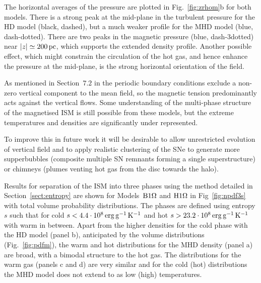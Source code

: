 \documentclass[useAMS,usenatbib]{mn2e}
\begin{document}
The horizontal averages of the pressure are plotted in Fig.~\ref{fig:zrhom}b for both models. There is a strong peak at the mid-plane in the turbulent pressure for the HD model (black, dashed), but a much weaker profile for the MHD model (blue, dash-dotted). There are two peaks in the magnetic pressure (blue, dash-3dotted) near $|z|\simeq200\,{\rm pc}$, which supports the extended density profile. Another possible effect, which might constrain the circulation of the hot gas, and hence enhance the pressure at the mid-plane, is the strong horizontal orientation of the field.

As mentioned in Section~$7.2$ in \citet{Gent12} the periodic boundary conditions exclude a non-zero vertical component to the mean field, so the magnetic tension predominantly acts against the vertical flows. Some understanding of the multi-phase structure of the magnetised ISM is still possible from these models, but the extreme temperatures and densities
are significantly under represented.

To improve this in future work it will be desirable to allow unrestricted  evolution of vertical field and to apply realistic clustering of the SNe to generate more supperbubbles (composite multiple SN remnants forming a  single superstructure) or chimneys (plumes venting hot gas from the disc  towards the halo).

Results for separation of the ISM into three phases using the method  detailed in Section~\ref{sect:entropy} are shown for Models~${\mathrm{B}1\rm{\Omega} }$ and  ${\mathrm{H}1\rm{\Omega}}$ in Fig~\ref{fig:npdf3s} with total volume probability distributions.
The phases are defined using entropy $s$ such that for cold  $s<4.4\cdot10^{8}\,{\rm erg} \,{\rm g}^{-1}\,{\rm K}^{-1}$ and hot $s>23.2\cdot10^{8}\,{\rm erg} \,{\rm g}^{-1}\,{\rm K}^{-1}$ with warm in between.
Apart from the higher densities for the cold phase with the HD model (panel b), anticipated by the volume distributions (Fig.~\ref{fig:pdfm}), the warm and hot distributions for the MHD density (panel a) are broad, with a bimodal structure to the hot gas. 
The distributions for the warm gas (panels c and d) are very similar and for the cold (hot) distributions the MHD model does not extend to as low (high) temperatures. 
\end{document}
